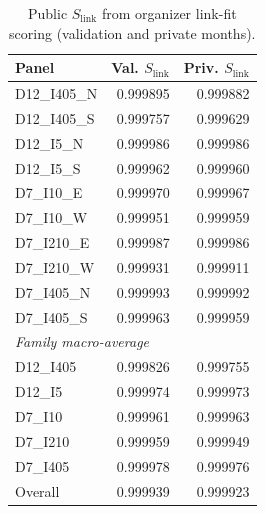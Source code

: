 \begin{table}[t]
\caption{Public $S_{\mathrm{link}}$ from organizer link-fit scoring (validation and private months).}
\centering\scriptsize
\begin{tabular}{lrr}
\hline Panel & Val. $S_{\mathrm{link}}$ & Priv. $S_{\mathrm{link}}$ \\
\hline
D12\_I405\_N & 0.999895 & 0.999882 \\
D12\_I405\_S & 0.999757 & 0.999629 \\
D12\_I5\_N & 0.999986 & 0.999986 \\
D12\_I5\_S & 0.999962 & 0.999960 \\
D7\_I10\_E & 0.999970 & 0.999967 \\
D7\_I10\_W & 0.999951 & 0.999959 \\
D7\_I210\_E & 0.999987 & 0.999986 \\
D7\_I210\_W & 0.999931 & 0.999911 \\
D7\_I405\_N & 0.999993 & 0.999992 \\
D7\_I405\_S & 0.999963 & 0.999959 \\
\hline
\multicolumn{3}{l}{\textit{Family macro-average}} \\
D12\_I405 & 0.999826 & 0.999755 \\
D12\_I5 & 0.999974 & 0.999973 \\
D7\_I10 & 0.999961 & 0.999963 \\
D7\_I210 & 0.999959 & 0.999949 \\
D7\_I405 & 0.999978 & 0.999976 \\
\hline
Overall & 0.999939 & 0.999923 \\
\hline\end{tabular}
\end{table}